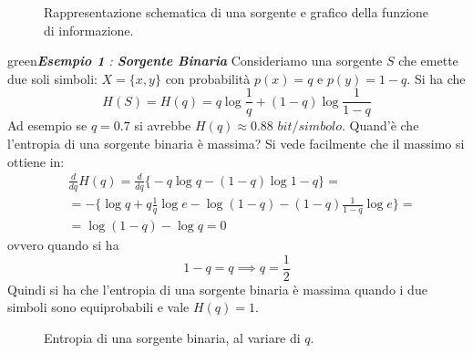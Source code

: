 \begin{figure}[!tbp]
  \centering
  \hspace{15pt}
  \caption{Rappresentazione schematica di una sorgente e grafico della funzione di informazione.}
  \label{fig:autoinf}
\end{figure}

\begin{mybox}{green}{\textit{\textbf{Esempio 1} : \textbf{Sorgente Binaria}}}
Consideriamo una sorgente $S$ che emette due soli simboli: $X = \{x,y\}$ con probabilit\`a $p(x) = q$ e $p(y) = 1- q$. Si ha che 
\begin{equation}
H(S) = H(q) = q \log \frac{1}{q} + (1-q)\log \frac{1}{1-q}
\end{equation}
Ad esempio se $q=0.7$ si avrebbe $H(q) \approx 0.88$ $bit/simbolo$. Quand'\`e che l'entropia di una sorgente binaria \`e massima? Si vede facilmente che il massimo si ottiene in:
\begin{align*}
    &\frac{d}{dq} H(q) = \frac{d}{dq} \Big \{ -q \log q - (1-q) \log{1-q} \Big \} = \\
    &= - \Big \{ \log q + q \frac{1}{q} \log e -\log(1-q) - (1-q)\frac{1}{1-q} \log e \Big \} = \\
    &= \log{(1-q)} - \log{q} = 0 
\end{align*}
ovvero quando si ha
\[
1-q = q \implies q = \frac{1}{2}
\]
Quindi si ha che l'entropia di una sorgente binaria \`e massima quando i due simboli sono equiprobabili e vale $H(q) = 1$.

\begin{figure}[H]
    \centering
    \caption{Entropia di una sorgente binaria, al variare di $q$.}
    \label{fig:binentropy}
\end{figure}
\end{mybox}

